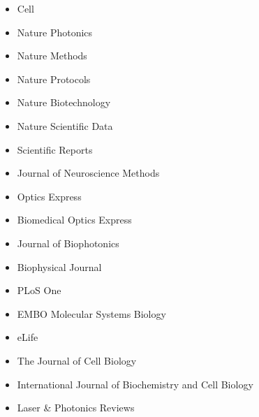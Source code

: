 \begin{itemize}
\item Cell
\item Nature Photonics
\item Nature Methods
\item Nature Protocols
\item Nature Biotechnology
\item Nature Scientific Data
\item Scientific Reports
\item Journal of Neuroscience Methods
\item Optics Express
\item Biomedical Optics Express
\item Journal of Biophotonics
\item Biophysical Journal
\item PLoS One
\item EMBO Molecular Systems Biology 
\item eLife
\item The Journal of Cell Biology
\item International Journal of Biochemistry and Cell Biology
\item Laser \& Photonics Reviews
\end{itemize}